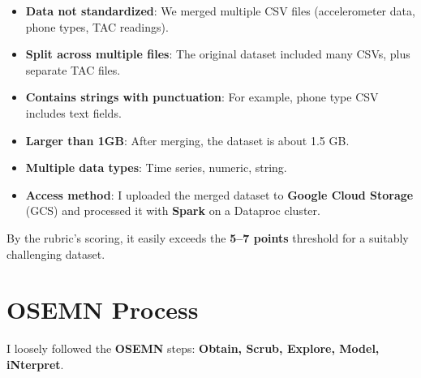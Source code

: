 \documentclass[
  letterpaper,
  DIV=11,
  numbers=noendperiod]{scrartcl}
\providecommand{\tightlist}{%
  \setlength{\itemsep}{0pt}\setlength{\parskip}{0pt}}\usepackage{longtable,booktabs,array}
\begin{document}
\begin{itemize}
\tightlist
\item
  \textbf{Data not standardized}: We merged multiple CSV files
  (accelerometer data, phone types, TAC readings).
\item
  \textbf{Split across multiple files}: The original dataset included
  many CSVs, plus separate TAC files.
\item
  \textbf{Contains strings with punctuation}: For example, phone type
  CSV includes text fields.
\item
  \textbf{Larger than 1GB}: After merging, the dataset is about 1.5 GB.
\item
  \textbf{Multiple data types}: Time series, numeric, string.
\item
  \textbf{Access method}: I uploaded the merged dataset to
  \textbf{Google Cloud Storage} (GCS) and processed it with
  \textbf{Spark} on a Dataproc cluster.
\end{itemize}

By the rubric's scoring, it easily exceeds the \textbf{5--7 points}
threshold for a suitably challenging dataset.

\section{OSEMN Process}\label{osemn-process}

I loosely followed the \textbf{OSEMN} steps: \textbf{Obtain, Scrub,
Explore, Model, iNterpret}.
\end{document}
